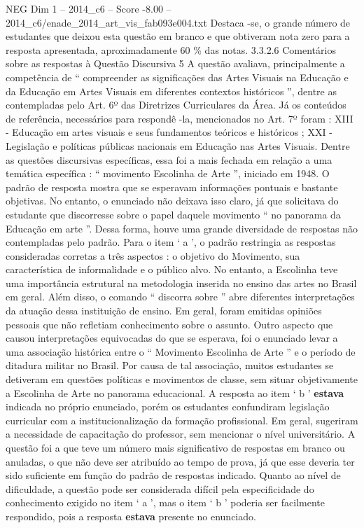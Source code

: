 \begin{textsample}{NEG Dim 1 – 2014\_c6 – Score -8.00 – 2014\_c6/enade\_2014\_art\_vis\_fab093e004.txt}
Destaca -se, o grande número de estudantes que deixou esta questão em branco e que obtiveram nota zero para a resposta apresentada, aproximadamente 60 \% das notas. 3.3.2.6 Comentários sobre as respostas à Questão Discursiva 5 A questão avaliava, principalmente a competência de “ compreender as significações das Artes Visuais na Educação e da Educação em Artes Visuais em diferentes contextos históricos ”, dentre as contempladas pelo Art. 6º das Diretrizes Curriculares da Área.
Já os conteúdos de referência, necessários para respondê -la, mencionados no Art. 7º foram : XIII - Educação em artes visuais e seus fundamentos teóricos e históricos ; XXI - Legislação e políticas públicas nacionais em Educação nas Artes Visuais.
Dentre as questões discursivas específicas, essa foi a mais fechada em relação a uma temática específica : “ movimento Escolinha de Arte ”, iniciado em 1948.
O padrão de resposta mostra que se esperavam informações pontuais e bastante objetivas.
No entanto, o enunciado não deixava isso claro, já que solicitava do estudante que discorresse sobre o papel daquele movimento “ no panorama da Educação em arte ”.
Dessa forma, houve uma grande diversidade de respostas não contempladas pelo padrão.
Para o item ‘ a ’, o padrão restringia as respostas consideradas corretas a três aspectos : o objetivo do Movimento, sua característica de informalidade e o público alvo.
No entanto, a Escolinha teve uma importância estrutural na metodologia inserida no ensino das artes no Brasil em geral.
Além disso, o comando “ discorra sobre ” abre diferentes interpretações da atuação dessa instituição de ensino.
Em geral, foram emitidas opiniões pessoais que não refletiam conhecimento sobre o assunto.
Outro aspecto que causou interpretações equivocadas do que se esperava, foi o enunciado levar a uma associação histórica entre o “ Movimento Escolinha de Arte ” e o período de ditadura militar no Brasil.
Por causa de tal associação, muitos estudantes se detiveram em questões políticas e movimentos de classe, sem situar objetivamente a Escolinha de Arte no panorama educacional.
A resposta ao item ‘ b ’ \textbf{estava} indicada no próprio enunciado, porém os estudantes confundiram legislação curricular com a institucionalização da formação profissional.
Em geral, sugeriram a necessidade de capacitação do professor, sem mencionar o nível universitário.
A questão foi a que teve um número mais significativo de respostas em branco ou anuladas, o que não deve ser atribuído ao tempo de prova, já que esse deveria ter sido suficiente em função do padrão de respostas indicado.
Quanto ao nível de dificuldade, a questão pode ser considerada difícil pela especificidade do conhecimento exigido no item ‘ a ’, mas o item ‘ b ’ poderia ser facilmente respondido, pois a resposta \textbf{estava} presente no enunciado.

\end{textsample}
